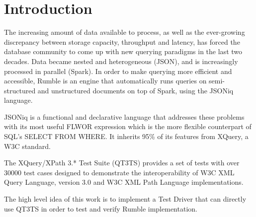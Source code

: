 
\chapter{Introduction}

The increasing amount of data available to process, as well as the ever-growing discrepancy between storage capacity, throughput and latency, has forced the database community to come up with new querying paradigms in the last two decades. Data became nested and heterogeneous (JSON), and is increasingly processed in parallel (Spark). In order to make querying more efficient and accessible, Rumble \cite{RumblePaper} is an engine that automatically runs queries on semi-structured and unstructured documents on top of Spark, using the JSONiq language. 

JSONiq \cite{JSONIQ}is a functional and declarative language that addresses these problems with its most useful FLWOR expression which is the more flexible counterpart of SQL’s SELECT FROM WHERE. It inherits 95\% of its features from XQuery, a W3C standard.

The XQuery/XPath 3.* Test Suite (QT3TS) \cite{TestSuite} provides a set of tests with over 30000 test cases designed to demonstrate the interoperability of W3C XML Query Language, version 3.0 and W3C XML Path Language implementations.

The high level idea of this work is to implement a Test Driver that can directly use QT3TS in order to test and verify Rumble implementation.